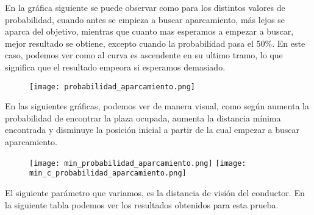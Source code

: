 En la gráfica siguiente se puede observar como para los distintos valores de probabilidad, cuando antes se empieza a buscar aparcamiento, más lejos se aparca del objetivo, mientras que cuanto mas esperamos a empezar a buscar, mejor resultado se obtiene, excepto cuando la probabilidad pasa el 50\%. En este caso, podemos ver como al curva es ascendente en su ultimo tramo, lo que significa que el resultado empeora si esperamos demasiado.

\begin{figure}[h]
\texttt{[image: probabilidad\_aparcamiento.png]}
\centering
\end{figure}

\newpage
En las siguientes gráficas, podemos ver de manera visual, como según aumenta la probabilidad de encontrar la plaza ocupada, aumenta la distancia mínima encontrada y disminuye la posición inicial a partir de la cual empezar a buscar aparcamiento.
\begin{figure}[h]
\texttt{[image: min\_probabilidad\_aparcamiento.png]}
\texttt{[image: min\_c\_probabilidad\_aparcamiento.png]}
\centering
\end{figure}

\newpage

El siguiente parámetro que variamos, es la distancia de visión del conductor. En la siguiente tabla podemos ver los resultados obtenidos para esta prueba.

\begin{table}[h]
\centering
{}
\end{table}

